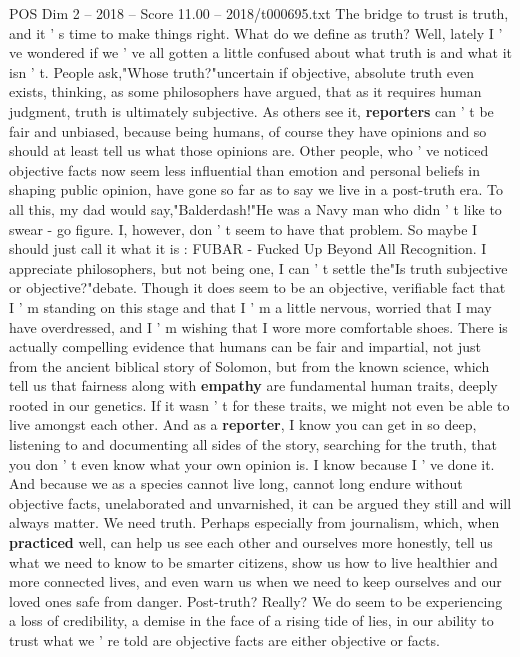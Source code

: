 \begin{textsample}{POS Dim 2 – 2018 – Score 11.00 – 2018/t000695.txt}
The bridge to trust is truth, and it ' s time to make things right.
What do we define as truth?
Well, lately I ' ve wondered if we ' ve all gotten a little confused about what truth is and what it isn ' t.
People ask,"Whose truth?"uncertain if objective, absolute truth even exists, thinking, as some philosophers have argued, that as it requires human judgment, truth is ultimately subjective.
As others see it, \textbf{reporters} can ' t be fair and unbiased, because being humans, of course they have opinions and so should at least tell us what those opinions are.
Other people, who ' ve noticed objective facts now seem less influential than emotion and personal beliefs in shaping public opinion, have gone so far as to say we live in a post-truth era.
To all this, my dad would say,"Balderdash!"He was a Navy man who didn ' t like to swear - go figure.
I, however, don ' t seem to have that problem.
So maybe I should just call it what it is : FUBAR - Fucked Up Beyond All Recognition.
I appreciate philosophers, but not being one, I can ' t settle the"Is truth subjective or objective?"debate.
Though it does seem to be an objective, verifiable fact that I ' m standing on this stage and that I ' m a little nervous, worried that I may have overdressed, and I ' m wishing that I wore more comfortable shoes.
There is actually compelling evidence that humans can be fair and impartial, not just from the ancient biblical story of Solomon, but from the known science, which tell us that fairness along with \textbf{empathy} are fundamental human traits, deeply rooted in our genetics.
If it wasn ' t for these traits, we might not even be able to live amongst each other.
And as a \textbf{reporter}, I know you can get in so deep, listening to and documenting all sides of the story, searching for the truth, that you don ' t even know what your own opinion is.
I know because I ' ve done it.
And because we as a species cannot live long, cannot long endure without objective facts, unelaborated and unvarnished, it can be argued they still and will always matter.
We need truth.
Perhaps especially from journalism, which, when \textbf{practiced} well, can help us see each other and ourselves more honestly, tell us what we need to know to be smarter citizens, show us how to live healthier and more connected lives, and even warn us when we need to keep ourselves and our loved ones safe from danger.
Post-truth?
Really?
We do seem to be experiencing a loss of credibility, a demise in the face of a rising tide of lies, in our ability to trust what we ' re told are objective facts are either objective or facts.

\end{textsample}
